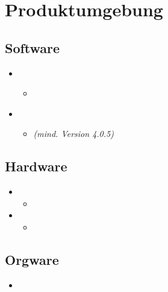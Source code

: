 \section{Produktumgebung}


\subsection{Software}

\begin{itemize}
  \item
    \begin{itemize}
      \item \textbf{}
    \end{itemize}
  \item
    \begin{itemize}
      \item \textbf{} \textit{(mind. Version 4.0.5)}
    \end{itemize}
\end{itemize}

\subsection{Hardware}

\begin{itemize}
  \item
    \begin{itemize}
      \item
    \end{itemize}
  \item
    \begin{itemize}
      \item
    \end{itemize}
\end{itemize}

\subsection{Orgware}

\begin{itemize}
  \item
\end{itemize}
